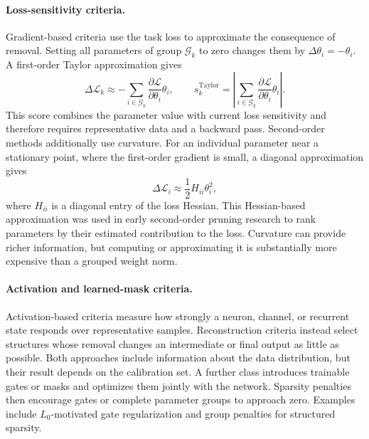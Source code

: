 \documentclass[
    a4paper,
    12pt,
    titlepage,
    bibliography=totoc,
    twoside=on,
    parskip=false,
    numbers=noenddot,
    cleardoublepage=empty,
    DIV=12,
    BCOR=12.0mm,
    headheight=36pt,
    headings=openright
]{scrreprt}
\begin{document}
\paragraph{Loss-sensitivity criteria.}
Gradient-based criteria use the task loss to approximate the consequence of removal. Setting all parameters of group $\mathcal G_k$ to zero changes them by $\Delta\theta_i=-\theta_i$. A first-order Taylor approximation gives
\begin{equation}
    \Delta\mathcal L_k
    \approx
    -
    \sum_{i\in\mathcal G_k}
    \frac{\partial\mathcal L}{\partial\theta_i}\theta_i,
    \qquad
    s_k^{\mathrm{Taylor}}
    =
    \left|
        \sum_{i\in\mathcal G_k}
        \frac{\partial\mathcal L}{\partial\theta_i}\theta_i
    \right|.
    \label{eq:fundamental_taylor_score}
\end{equation}
This score combines the parameter value with current loss sensitivity and therefore requires representative data and a backward pass. Second-order methods additionally use curvature. For an individual parameter near a stationary point, where the first-order gradient is small, a diagonal approximation gives
\begin{equation}
    \Delta\mathcal L_i
    \approx
    \frac{1}{2}H_{ii}\theta_i^2,
    \label{eq:fundamental_second_order_pruning}
\end{equation}
where $H_{ii}$ is a diagonal entry of the loss Hessian. This Hessian-based approximation was used in early second-order pruning research to rank parameters by their estimated contribution to the loss. Curvature can provide richer information, but computing or approximating it is substantially more expensive than a grouped weight norm.\autocite{lecunOptimalBrainDamage1989,molchanovImportanceEstimation2019}

\paragraph{Activation and learned-mask criteria.}
Activation-based criteria measure how strongly a neuron, channel, or recurrent state responds over representative samples. Reconstruction criteria instead select structures whose removal changes an intermediate or final output as little as possible. Both approaches include information about the data distribution, but their result depends on the calibration set. A further class introduces trainable gates or masks and optimizes them jointly with the network. Sparsity penalties then encourage gates or complete parameter groups to approach zero. Examples include $L_0$-motivated gate regularization and group penalties for structured sparsity.\autocite{louizosLearningSparseL02018,wenLearningStructuredSparsity2016,liuNetworkSlimming2017}
\end{document}
